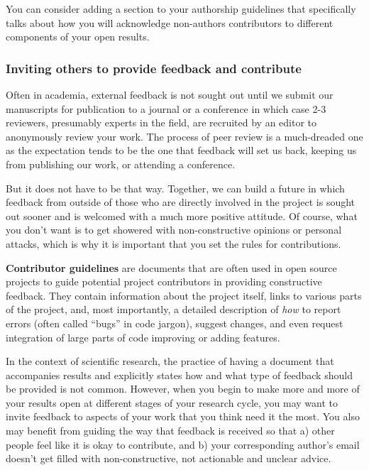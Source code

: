 \documentclass[
  letterpaper,
  DIV=11,
  numbers=noendperiod]{scrreport}
\begin{document}
You can consider adding a section to your authorship guidelines that
specifically talks about how you will acknowledge non-authors
contributors to different components of your open results.

\hypertarget{inviting-others-to-provide-feedback-and-contribute}{%
\subsubsection{Inviting others to provide feedback and
contribute}\label{inviting-others-to-provide-feedback-and-contribute}}

Often in academia, external feedback is not sought out until we submit
our manuscripts for publication to a journal or a conference in which
case 2-3 reviewers, presumably experts in the field, are recruited by an
editor to anonymously review your work. The process of peer review is a
much-dreaded one as the expectation tends to be the one that feedback
will set us back, keeping us from publishing our work, or attending a
conference.

But it does not have to be that way. Together, we can build a future in
which feedback from outside of those who are directly involved in the
project is sought out sooner and is welcomed with a much more positive
attitude. Of course, what you don't want is to get showered with
non-constructive opinions or personal attacks, which is why it is
important that you set the rules for contributions.

\textbf{Contributor guidelines} are documents that are often used in
open source projects to guide potential project contributors in
providing constructive feedback. They contain information about the
project itself, links to various parts of the project, and, most
importantly, a detailed description of \emph{how} to report errors
(often called ``bugs'' in code jargon), suggest changes, and even
request integration of large parts of code improving or adding features.

In the context of scientific research, the practice of having a document
that accompanies results and explicitly states how and what type of
feedback should be provided is not common. However, when you begin to
make more and more of your results open at different stages of your
research cycle, you may want to invite feedback to aspects of your work
that you think need it the most. You also may benefit from guiding the
way that feedback is received so that a) other people feel like it is
okay to contribute, and b) your corresponding author's email doesn't get
filled with non-constructive, not actionable and unclear advice.
\end{document}
